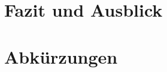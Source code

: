 \documentclass[conference,compsoc,final,a4paper]{IEEEtran}
\begin{document}
    \section{Fazit und Ausblick}


    \section*{Abkürzungen}

    \begin{acronym}[IEEE]
    \end{acronym}

    \AtNextBibliography{\small}
    \printbibliography
\end{document}
